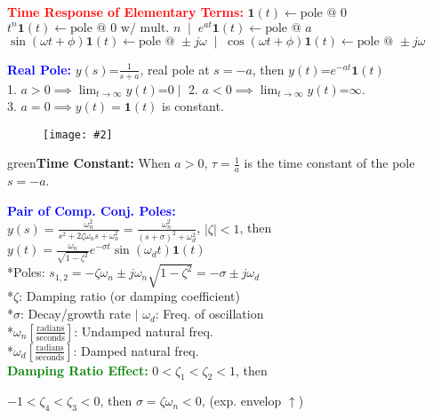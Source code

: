 \documentclass[5pt]{extarticle} %
\newcommand{\customFigure}[3][]{%
    \vspace{-1.5em}
    \begin{figure}[H]
        \centering
        \texttt{[image: \#2]}
    \end{figure}
    \vspace{-1.5em}
}
\begin{document}
\begin{paracol}{3}
{    \textcolor{red}{\textbf{Time Response of Elementary Terms:}} $\mathbf{1}(t) \leftarrow \text{pole @ 0}$ \\
    $t^n \mathbf{1}(t) \leftarrow \text{pole @ $0$ w/ mult. $n$} \; \mid \; e^{at} \mathbf{1}(t) \leftarrow \text{pole @ } a$ \\
    $\sin(\omega t + \phi) \mathbf{1}(t) \leftarrow \text{pole @ } \pm j \omega \; \mid \; \cos(\omega t + \phi) \mathbf{1}(t) \leftarrow \text{pole @ } \pm j \omega$ 

    \textcolor{blue}{\textbf{Real Pole:}} $y(s) \text{=} \frac{1}{s+a}$, real pole at $s = -a$, then $y(t) \text{=} e^{-at} \mathbf{1}(t)$ \\
    1. $a>0 \implies \lim_{t \rightarrow \infty} y(t) \text{=} 0 \mid$ 2. $a<0 \implies \lim_{t \rightarrow \infty} y(t) \text{=} \infty$. \\
    3. $a=0 \implies y(t) = \mathbf{1}(t)$ is constant.
    \customFigure[0.1]{../Images/L10_0.png}

    \textcolor{green}{\textbf{Time Constant:}} When $a>0$, $\tau = \frac{1}{a}$ is the time constant of the pole $s=-a$.

    \textcolor{blue}{\textbf{Pair of Comp. Conj. Poles:}} \\
    $y(s) = \frac{\omega_n^2}{s^2 + 2\zeta\omega_n s + \omega_n^2} = \frac{\omega_n^2}{(s + \sigma)^2 + \omega_d^2}$, $|\zeta| < 1$, then \\
    $y(t) = \frac{\omega_n}{\sqrt{1 - \zeta^2}} e^{-\sigma t} \sin(\omega_d t) \mathbf{1}(t)$ \\
    *Poles: $s_{1,2} = - \zeta \omega_n \pm j \omega_n \sqrt{1 - \zeta^2} = -\sigma \pm j \omega_d$ \\
    *$\zeta$: Damping ratio (or damping coefficient) \\
    *$\sigma$: Decay/growth rate $\mid$ $\omega_d$: Freq. of oscillation \\
    *$\omega_n \left[\frac{\text{radians}}{\text{seconds}} \right]$: Undamped natural freq. \\
    *$\omega_d \left[\frac{\text{radians}}{\text{seconds}} \right]$: Damped natural freq. \\

    \textcolor{green}{\textbf{Damping Ratio Effect:}} $0 < \zeta_1 < \zeta_2 < 1$, then \\

    $-1 < \zeta_4 < \zeta_3 < 0$, then $\sigma = \zeta \omega_n <0$, (exp. envelop $\uparrow$) \\

}
\end{paracol}
\end{document}
